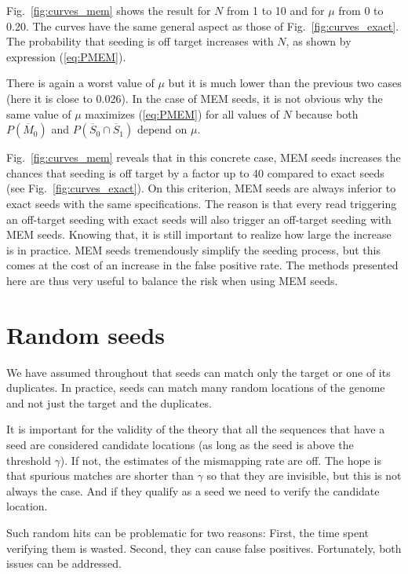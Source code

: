 \documentclass{article}
\begin{document}
Fig.~\ref{fig:curves_mem} shows the result for $N$ from 1 to 10 and for
$\mu$ from 0 to 0.20. The curves have the same general aspect as those of
Fig.~\ref{fig:curves_exact}. The probability that seeding is off target
increases with $N$, as shown by expression (\ref{eq:PMEM}).

There is again a  worst value of $\mu$ but it is much lower than the
previous two cases (here it is close to 0.026). In the case of MEM seeds,
it is not obvious why the same value of $\mu$ maximizes (\ref{eq:PMEM})
for all values of $N$ because both $P(\overline{M}_0)$ and
$P(\overline{S}_0 \cap \overline{S}_1)$ depend on $\mu$.

Fig.~\ref{fig:curves_mem} reveals that in this concrete case, MEM seeds
increases the chances that seeding is off target by a factor up to 40
compared to exact seeds (see Fig.~\ref{fig:curves_exact}). On this
criterion, MEM seeds are always inferior to exact seeds with the same
specifications. The reason is that every read triggering an off-target
seeding with exact seeds will also trigger an off-target seeding with MEM
seeds. Knowing that, it is still important to realize how large the
increase is in practice. MEM seeds tremendously simplify the seeding
process, but this comes at the cost of an increase in the false positive
rate. The methods presented here are thus very useful to balance the
risk when using MEM seeds.


\section{Random seeds}
\label{sec:random_seeds}

We have assumed throughout that seeds can match only the target or one of
its duplicates. In practice, seeds can match many random locations of the
genome and not just the target and the duplicates.

It is important for the validity of the theory that all the sequences that
have a seed are considered candidate locations (as long as the seed is
above the threshold $\gamma$). If not, the estimates of the mismapping
rate are off. The hope is that spurious matches are shorter than $\gamma$
so that they are invisible, but this is not always the case. And if they
qualify as a seed we need to verify the candidate location.

Such random hits can be problematic for two reasons: First, the time spent
verifying them is wasted. Second, they can cause false positives.
Fortunately, both issues can be addressed.
\end{document}
